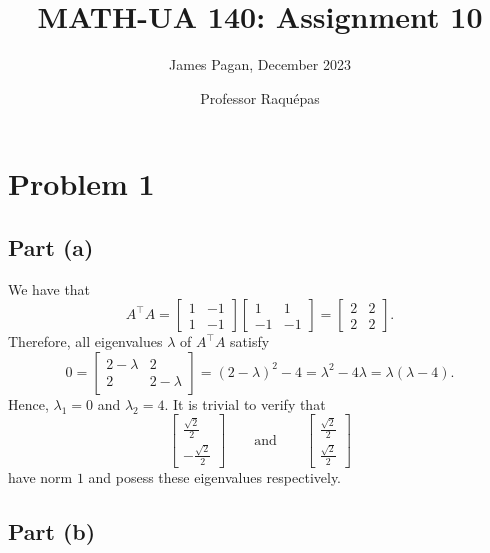 \documentclass[11pt]{article}
\title{MATH-UA 140: Assignment 10}
\author{James Pagan, December 2023}
\date{Professor Raquépas}
\begin{document}
\maketitle
\tableofcontents
\newpage


\section{Problem 1}


\subsection{Part (a)}

We have that
\[
	A^{\top}A = \begin{bmatrix} 1 & -1 \\ 1 & -1 \end{bmatrix} \begin{bmatrix} 1 & 1 \\ -1 & -1 \end{bmatrix} = \begin{bmatrix} 2 & 2 \\ 2 & 2 \end{bmatrix}.
\]
Therefore, all eigenvalues $\lambda$ of $A^{\top}A$ satisfy
\[
	0 = \begin{bmatrix} 2 - \lambda & 2 \\ 2 & 2 - \lambda \end{bmatrix} = (2 - \lambda)^{2} - 4 = \lambda^{2} - 4\lambda = \lambda(\lambda - 4).
\]
Hence, $\lambda_{1} = 0$ and $\lambda_{2} = 4$. It is trivial to verify that
\[
	\boxed{ \begin{bmatrix} \tfrac{\sqrt{2}}{2} \\ -\tfrac{\sqrt{2}}{2} \end{bmatrix} \qquad \text{and} \qquad \begin{bmatrix} \tfrac{\sqrt{2}}{2} \\ \tfrac{\sqrt{2}}{2} \end{bmatrix}}
\]
have norm $1$ and posess these eigenvalues respectively.


\subsection{Part (b)}
\end{document}

